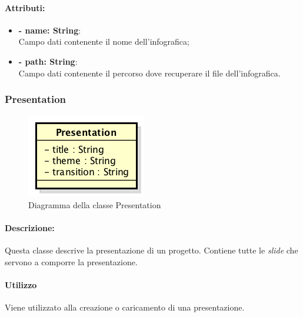 	\paragraph{Attributi:}
	\begin{itemize}
		\item \textbf{- name: String}:\\
			Campo dati contenente il nome dell'\gls{infografica};
		\item \textbf{- path: String}:\\
			Campo dati contenente il percorso dove recuperare il file dell'\gls{infografica}.
		\end{itemize}
			
	
\newpage


\subsubsection{Presentation}

	\begin{figure}[h]
		\centering
		\includegraphics[width=0.4\linewidth]{img/premi_front_end_model_presentation}
		\caption[Diagramma della classe Presentation]{Diagramma della classe Presentation}
		\label{fig:back_end_premi_model_presentation}
	\end{figure}
	
	
	\paragraph{Descrizione:}
	Questa classe descrive la presentazione di un progetto. Contiene tutte le \textit{\gls{slide}} che servono a comporre la presentazione.
	
	\paragraph{Utilizzo}
	Viene utilizzato alla creazione o caricamento di una presentazione.
	
